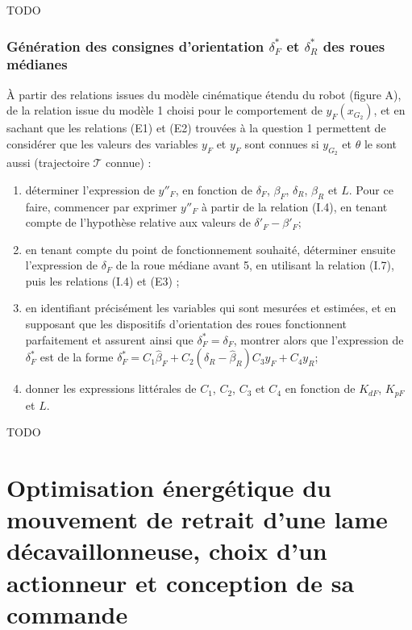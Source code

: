 \documentclass[11pt]{article}
\begin{document}
\begin{UPSTIcorrige}
TODO
\end{UPSTIcorrige}

\subsubsection{Génération des consignes d'orientation $\delta_F^*$ et $\delta_R^*$ des roues médianes}


\UPSTIquestion À partir des relations issues du modèle cinématique étendu du robot (figure A), de la relation issue
du modèle 1 choisi pour le comportement de $y_F\left(x_{G_2}\right)$, et en sachant que les relations (E1) et (E2) trouvées à la question 1 permettent de considérer que les valeurs des variables $y_F$ et $y_F$ sont connues si $y_{G_2}$ et $\theta$ le sont aussi (trajectoire $\mathcal{T}$ connue) :
\begin{enumerate}
\item déterminer l’expression de $y''_F$, en fonction de $\delta_F$, $\beta_F$, $\delta_R$, $\beta_R$ et $L$. Pour ce faire, commencer par exprimer $y''_F$ à partir de la relation (I.4), en tenant compte de l’hypothèse relative aux valeurs de $\delta'_F-\beta'_F$;
\item en tenant compte du point de fonctionnement souhaité, déterminer ensuite l’expression de $\delta_F$ de la roue
médiane avant 5, en utilisant la relation (I.7), puis les relations (I.4) et (E3) ;
\item en identifiant précisément les variables qui sont mesurées et estimées, et en supposant que les dispositifs
d’orientation des roues fonctionnent parfaitement et assurent ainsi que $\delta^*_F = \delta_F$, montrer alors que l’expression de $\delta^*_F$ est de la forme $\delta^*_F =C_1 \hat{\beta}_F +C_2\left(\delta_R - \hat{\beta}_R\right)C_3 y_F + C_4 y_R$;
\item donner les expressions littérales de $C_1$, $C_2$, $C_3$ et $C_4$ en fonction de $K_{dF}$, $K_{pF}$ et $L$.
\end{enumerate}

\begin{UPSTIcorrige}
TODO
\end{UPSTIcorrige}


\section{Optimisation énergétique du mouvement de retrait d’une lame
décavaillonneuse, choix d’un actionneur et conception de sa commande}
\end{document}
